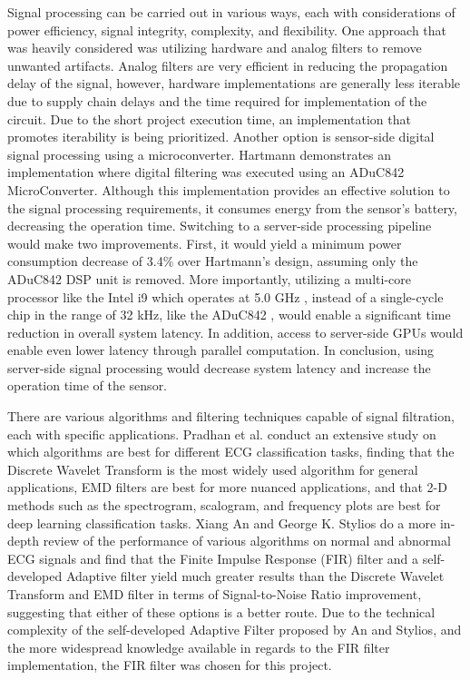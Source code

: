 \documentclass{article}
\begin{document}
Signal processing can be carried out in various ways, each with considerations of power efficiency, signal integrity, complexity, and flexibility. One approach that was heavily considered was utilizing hardware and analog filters to remove unwanted artifacts. Analog filters are very efficient in reducing the propagation delay of the signal, however, hardware implementations are generally less iterable due to supply chain delays and the time required for implementation of the circuit. Due to the short project execution time, an implementation that promotes iterability is being prioritized. Another option is sensor-side digital signal processing using a microconverter. Hartmann \cite{analogfilter} demonstrates an implementation where digital filtering was executed using an ADuC842 MicroConverter. Although this implementation provides an effective solution to the signal processing requirements, it consumes energy from the sensor's battery, decreasing the operation time. Switching to a server-side processing pipeline would make two improvements. First, it would yield a minimum power consumption decrease of 3.4\% over Hartmann's design, assuming only the ADuC842 DSP unit is removed. More importantly, utilizing a multi-core processor like the Intel i9 which operates at 5.0 GHz \cite{msi}, instead of a single-cycle chip in the range of 32 kHz, like the ADuC842 \cite{ADUC842}, would enable a significant time reduction in overall system latency. In addition, access to server-side GPUs would enable even lower latency through parallel computation. In conclusion, using server-side signal processing would decrease system latency and increase the operation time of the sensor.

There are various algorithms and filtering techniques capable of signal filtration, each with specific applications. Pradhan et al. \cite{timefreqmethods} conduct an extensive study on which algorithms are best for different ECG classification tasks, finding that the Discrete Wavelet Transform is the most widely used algorithm for general applications, EMD filters are best for more nuanced applications, and that 2-D methods such as the spectrogram, scalogram, and frequency plots are best for deep learning classification tasks. Xiang An and George K. Stylios \cite{filtercomparison} do a more in-depth review of the performance of various algorithms on normal and abnormal ECG signals and find that the Finite Impulse Response (FIR) filter and a self-developed Adaptive filter yield much greater results than the Discrete Wavelet Transform and EMD filter in terms of Signal-to-Noise Ratio improvement, suggesting that either of these options is a better route. Due to the technical complexity of the self-developed Adaptive Filter proposed by An and Stylios, and the more widespread knowledge available in regards to the FIR filter implementation, the FIR filter was chosen for this project.
\par
\newpage
\end{document}
